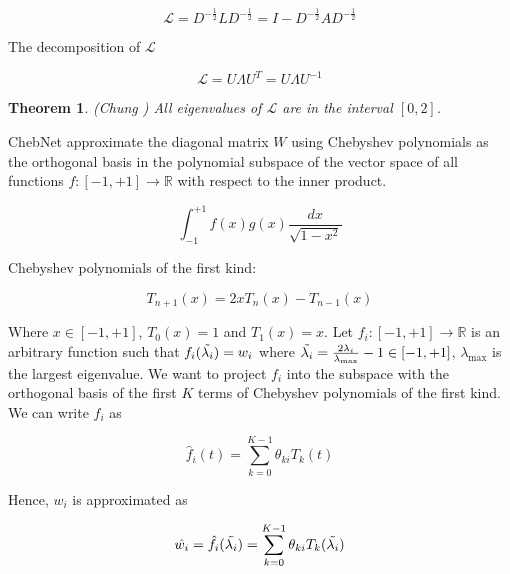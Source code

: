\documentclass{article}
\newtheorem{theorem}{Theorem}
\begin{document}
    \begin{equation}
        \mathcal{L} = D^{-\frac{1}{2}} L D^{-\frac{1}{2}} = I - D^{-\frac{1}{2}} A D^{-\frac{1}{2}}
    \end{equation}

    The decomposition of $\mathcal{L}$

    \begin{equation}
        \mathcal{L} = U \Lambda U^T = U \Lambda U^{-1}
    \end{equation}

    \begin{theorem}(Chung \cite{chung1997spectral})
        All eigenvalues of $\mathcal{L}$ are in the interval $[0, 2]$.
    \end{theorem}

    ChebNet \cite{defferrard2016convolutional} approximate the diagonal matrix $W$ using Chebyshev polynomials as the orthogonal basis in the polynomial subspace of the vector space of all functions $f: [-1, +1] \to \mathbb{R}$ with respect to the inner product.

    \begin{equation}
        \int_{-1}^{+1} f(x) g(x) \frac{dx}{\sqrt{1-x^2}}
    \end{equation}

    Chebyshev polynomials of the first kind:

    \begin{equation}
        T_{n+1}(x) = 2x T_n(x) - T_{n-1}(x)
    \end{equation}

    Where $x \in [-1, +1]$, $T_0(x) = 1$ and $T_1(x) = x$. Let $f_i: [-1, +1] \to \mathbb{R}$ is an arbitrary function such that $f_i(\Tilde{\lambda_i}) = w_i$ where $\Tilde{\lambda_i} = \frac{2 \lambda_i}{\lambda_{\max}} - 1 \in [-1, +1]$, $\lambda_{\max}$ is the largest eigenvalue. We want to project $f_i$ into the subspace with the orthogonal basis of the first $K$ terms of Chebyshev polynomials of the first kind. We can write $f_i$ as

    \begin{equation}
        \hat{f}_i(t) = \sum_{k=0}^{K-1} \theta_{k i} T_k(t)
    \end{equation}

    Hence, $w_i$ is approximated as

    \begin{equation}
        \hat{w_i} = \hat{f}_i(\Tilde{\lambda_i}) = \sum_{k=0}^{K-1} \theta_{k i} T_k(\Tilde{\lambda_i})
    \end{equation}
\end{document}
